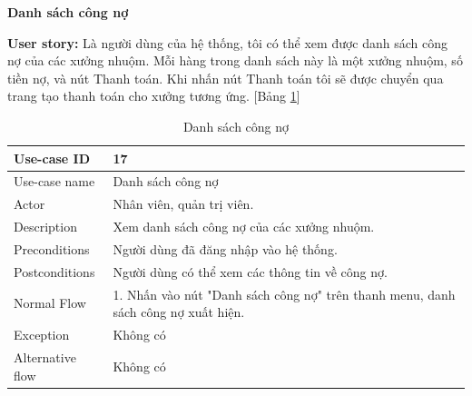 \textbf{Danh sách công nợ}\par
\textbf{User story:} Là người dùng của hệ thống, tôi có thể xem được danh sách công nợ của các xưởng nhuộm. Mỗi hàng trong danh sách này là một xưởng nhuộm, số tiền nợ, và nút Thanh toán. Khi nhấn nút Thanh toán tôi sẽ được chuyển qua trang tạo thanh toán cho xưởng tương ứng. [Bảng \ref{bang17}]
\begin{table}[H]
    \centering
    \begin{tabular}{|m{3cm}|m{10cm}|}
    \hline 
        Use-case ID & 17\\ \hline
        Use-case name & Danh sách công nợ\\ \hline
        Actor & Nhân viên, quản trị viên.\\ \hline
        Description & Xem danh sách công nợ của các xưởng nhuộm.\\ \hline
        Preconditions & Người dùng đã đăng nhập vào hệ thống.\\ \hline
        Postconditions & Người dùng có thể xem các thông tin về công nợ.\\ \hline
        Normal Flow & 
        1. Nhấn vào nút "Danh sách công nợ" trên thanh menu, danh sách công nợ xuất hiện.
        \\ \hline
        Exception & Không có\\ \hline
        Alternative flow & Không có\\ 
    \hline 
    \end{tabular}
    \caption{Danh sách công nợ}
    \label{bang17}
\end{table}


